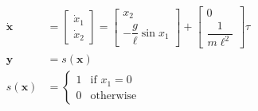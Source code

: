 \documentclass[border=0pt]{standalone}
\begin{document}
\begin{minipage}{4.6cm}
  \begin{align*}
    \dot{\mathbf{x}} &=
    \begin{bmatrix}
      \dot{x}_1 \\
      \dot{x}_2
    \end{bmatrix}
    =
    \begin{bmatrix}
      x_2 \\
      -\dfrac{g}{\ell} \sin x_1
    \end{bmatrix}
    +
    \begin{bmatrix}
      0 \\
      \dfrac{1}{m\ell^2}
    \end{bmatrix} \tau \\[0.75em]
    \mathbf{y} &= s(\mathbf{x}) \\[0.75em]
    s(\mathbf{x}) &= 
    \begin{cases}
      1 & \text{if } x_1 = 0 \\
      0 & \text{otherwise}
    \end{cases}
  \end{align*}
\end{minipage}
\end{document}
